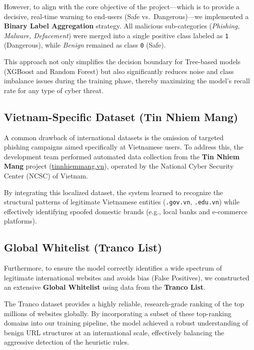 \documentclass[12pt,a4paper]{article}
\begin{document}
However, to align with the core objective of the project---which is to provide a decisive, real-time warning to end-users (Safe vs.\ Dangerous)---we implemented a \textbf{Binary Label Aggregation} strategy. All malicious sub-categories (\textit{Phishing, Malware, Defacement}) were merged into a single positive class labeled as \texttt{1} (Dangerous), while \textit{Benign} remained as class \texttt{0} (Safe).

This approach not only simplifies the decision boundary for Tree-based models (XGBoost and Random Forest) but also significantly reduces noise and class imbalance issues during the training phase, thereby maximizing the model's recall rate for any type of cyber threat.

\subsection{Vietnam-Specific Dataset (Tin Nhiem Mang)}
A common drawback of international datasets is the omission of targeted phishing campaigns aimed specifically at Vietnamese users. To address this, the development team performed automated data collection from the \textbf{Tin Nhiem Mang} project (\url{tinnhiemmang.vn}), operated by the National Cyber Security Center (NCSC) of Vietnam.

By integrating this localized dataset, the system learned to recognize the structural patterns of legitimate Vietnamese entities (\texttt{.gov.vn}, \texttt{.edu.vn}) while effectively identifying spoofed domestic brands (e.g., local banks and e-commerce platforms).

\subsection{Global Whitelist (Tranco List)}
Furthermore, to ensure the model correctly identifies a wide spectrum of legitimate international websites and avoids bias (False Positives), we constructed an extensive \textbf{Global Whitelist} using data from the \textbf{Tranco List}.

The Tranco dataset provides a highly reliable, research-grade ranking of the top millions of websites globally. By incorporating a subset of these top-ranking domains into our training pipeline, the model achieved a robust understanding of benign URL structures at an international scale, effectively balancing the aggressive detection of the heuristic rules.

\end{document}
